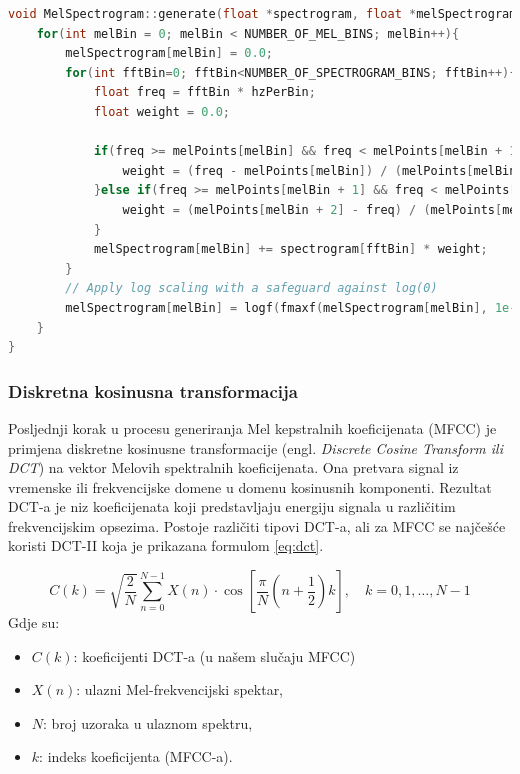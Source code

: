 \begin{lstlisting}[language=C++, caption=Generiranje Melovog spektrograma, label=code:mel]
void MelSpectrogram::generate(float *spectrogram, float *melSpectrogram){
    for(int melBin = 0; melBin < NUMBER_OF_MEL_BINS; melBin++){
        melSpectrogram[melBin] = 0.0;
        for(int fftBin=0; fftBin<NUMBER_OF_SPECTROGRAM_BINS; fftBin++){
            float freq = fftBin * hzPerBin;
            float weight = 0.0;

            if(freq >= melPoints[melBin] && freq < melPoints[melBin + 1]){
                weight = (freq - melPoints[melBin]) / (melPoints[melBin + 1] - melPoints[melBin]);
            }else if(freq >= melPoints[melBin + 1] && freq < melPoints[melBin + 2]){
                weight = (melPoints[melBin + 2] - freq) / (melPoints[melBin + 2] - melPoints[melBin + 1]);
            }
            melSpectrogram[melBin] += spectrogram[fftBin] * weight;
        }
        // Apply log scaling with a safeguard against log(0)
        melSpectrogram[melBin] = logf(fmaxf(melSpectrogram[melBin], 1e-6));
    }
}
\end{lstlisting}

\subsubsection{Diskretna kosinusna transformacija}

Posljednji korak u procesu generiranja Mel kepstralnih koeficijenata (MFCC) je primjena diskretne
kosinusne transformacije (engl. \textit{Discrete Cosine Transform ili DCT}) na vektor Melovih spektralnih
koeficijenata. Ona pretvara signal iz vremenske ili frekvencijske domene u 
domenu kosinusnih komponenti. Rezultat DCT-a je niz koeficijenata koji predstavljaju energiju 
signala u različitim frekvencijskim opsezima. 
Postoje različiti tipovi DCT-a, ali za MFCC se najčešće koristi DCT-II koja je prikazana
formulom \ref{eq:dct}.

\begin{equation}
    \label{eq:dct}
    C(k) = \sqrt{\frac{2}{N}} \sum_{n=0}^{N-1} X(n) \cdot \cos\left[ \frac{\pi}{N} \left(n + \frac{1}{2}\right) k \right], \quad k = 0, 1, \dots, N-1
\end{equation}
Gdje su:
\begin{itemize}
\item $C(k)$: koeficijenti DCT-a (u našem slučaju MFCC)
\item $X(n)$: ulazni Mel-frekvencijski spektar,
\item $N$: broj uzoraka u ulaznom spektru,
\item $k$: indeks koeficijenta (MFCC-a).
\end{itemize}

